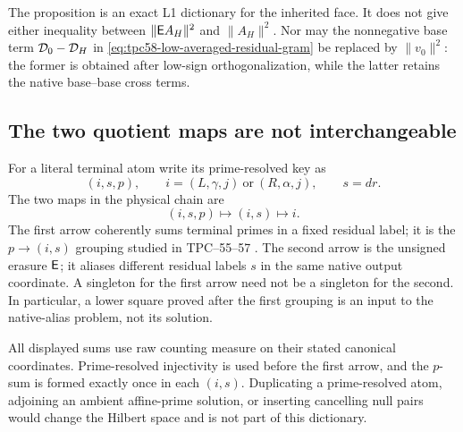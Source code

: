 The proposition is an exact L1 dictionary for the inherited face.  It does
not give either inequality between
\(\|\mathsf E A_H\|^2\) and \(\|A_H\|^2\).  Nor may the nonnegative base term
\(\mathcal D_0-\mathcal D_H\) in
\eqref{eq:tpc58-low-averaged-residual-gram} be replaced by
\(\|v_0\|^2\): the former is obtained after low-sign orthogonalization,
while the latter retains the native base--base cross terms.

\subsection{The two quotient maps are not interchangeable}

For a literal terminal atom write its prime-resolved key as
\begin{equation}
 (i,s,p),
 \qquad i=(L,\gamma,j)\ \text{or}\ (R,\alpha,j),
 \qquad s=dr.
 \label{eq:tpc58-prime-resolved-key}
\end{equation}
The two maps in the physical chain are
\begin{equation}
 \boxed{
 (i,s,p)\longmapsto(i,s)
 \longmapsto i.}
 \label{eq:tpc58-two-grouping-maps}
\end{equation}
The first arrow coherently sums terminal primes in a fixed residual label;
it is the \(p\to(i,s)\) grouping studied in TPC--55--57
\citep{WangTPC55,WangTPC56,WangTPC57}.  The second arrow is the unsigned
erasure \(\mathsf E\); it aliases different residual labels \(s\) in the same
native output coordinate.  A singleton for the first arrow need not be a
singleton for the second.  In particular, a lower square proved after the
first grouping is an input to the native-alias problem, not its solution.

All displayed sums use raw counting measure on their stated canonical
coordinates.  Prime-resolved injectivity is used before the first arrow,
and the \(p\)-sum is formed exactly once in each \((i,s)\).  Duplicating a
prime-resolved atom, adjoining an ambient affine-prime solution, or
inserting cancelling null pairs would change the Hilbert space and is not
part of this dictionary.
